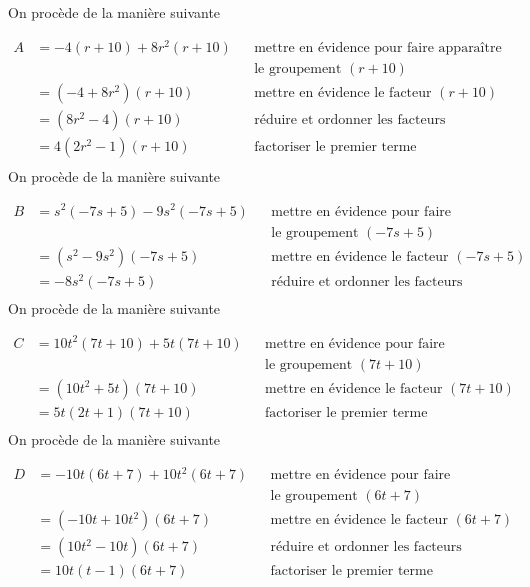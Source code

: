 \documentclass[a4paper,12pt]{report}
\begin{document}
\begin{cora}\phantom{ }

\begin{tasks}
\task On procède de la manière suivante 

\medskip
 $\begin{aligned}A&=-4 (r + 10 )+8 r^2(r + 10 )&&\text{mettre en évidence pour faire apparaître}\\
        & &&\text{le groupement }(r + 10 )\\&=(-4  + 8 r^2)(r + 10 )&& \text{mettre en évidence le facteur } (r + 10 )\\&=(8 r^2-4 )(r + 10 ) && \text{réduire et ordonner les facteurs}\\&={{4 (2 r^2-1)(r + 10 )}}&& \text{factoriser le premier terme}\\\end{aligned}$
\task On procède de la manière suivante 

\medskip
 $\begin{aligned}B&=s^2(-7 s + 5 )-9 s^2(-7 s + 5 )&&\text{mettre en évidence pour faire apparaître}\\
        & &&\text{le groupement }(-7 s + 5 )\\&=(s^2-9 s^2)(-7 s + 5 )&& \text{mettre en évidence le facteur } (-7 s + 5 )\\&={{-8 s^2(-7 s + 5 )}}&& \text{réduire et ordonner les facteurs}\\\end{aligned}$
\task On procède de la manière suivante 

\medskip
 $\begin{aligned}C&=10 t^2(7 t + 10 )+5 t(7 t + 10 )&&\text{mettre en évidence pour faire apparaître}\\
        & &&\text{le groupement }(7 t + 10 )\\&=(10 t^2 + 5 t)(7 t + 10 )&& \text{mettre en évidence le facteur } (7 t + 10 )\\&={{5 t(2 t + 1)(7 t + 10 )}}&& \text{factoriser le premier terme}\\\end{aligned}$
\task On procède de la manière suivante 

\medskip
 $\begin{aligned}D&=-10 t(6 t + 7 )+10 t^2(6 t + 7 )&&\text{mettre en évidence pour faire apparaître}\\
        & &&\text{le groupement }(6 t + 7 )\\&=(-10 t + 10 t^2)(6 t + 7 )&& \text{mettre en évidence le facteur } (6 t + 7 )\\&=(10 t^2-10 t)(6 t + 7 ) && \text{réduire et ordonner les facteurs}\\&={{10 t(t-1)(6 t + 7 )}}&& \text{factoriser le premier terme}\\\end{aligned}$
\end{tasks}

\end{cora}
\end{document}
